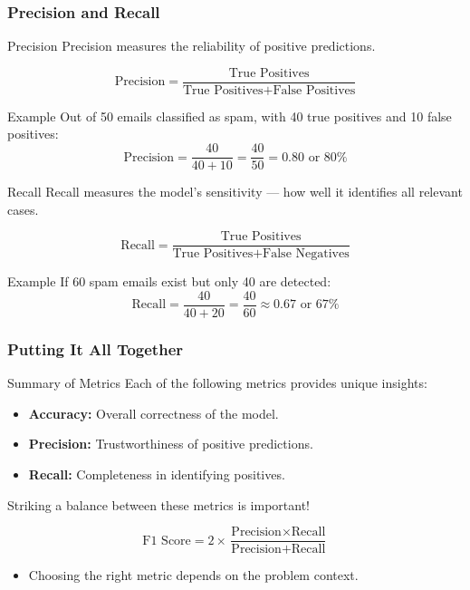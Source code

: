 \documentclass[aspectratio=169]{beamer}
\begin{document}
\begin{frame}[fragile]
    \frametitle{Precision and Recall}
    \begin{block}{Precision}
        Precision measures the reliability of positive predictions.
    \end{block}
    \begin{equation}
        \text{Precision} = \frac{\text{True Positives}}{\text{True Positives} + \text{False Positives}}
    \end{equation}
    
    \begin{exampleblock}{Example}
        Out of 50 emails classified as spam, with 40 true positives and 10 false positives:
        \[
        \text{Precision} = \frac{40}{40 + 10} = \frac{40}{50} = 0.80 \text{ or } 80\%
        \]
    \end{exampleblock}

    \begin{block}{Recall}
        Recall measures the model's sensitivity — how well it identifies all relevant cases.
    \end{block}
    \begin{equation}
        \text{Recall} = \frac{\text{True Positives}}{\text{True Positives} + \text{False Negatives}}
    \end{equation}
    \begin{exampleblock}{Example}
        If 60 spam emails exist but only 40 are detected:
        \[
        \text{Recall} = \frac{40}{40 + 20} = \frac{40}{60} \approx 0.67 \text{ or } 67\%
        \]
    \end{exampleblock}
\end{frame}

\begin{frame}[fragile]
    \frametitle{Putting It All Together}
    \begin{block}{Summary of Metrics}
        Each of the following metrics provides unique insights:
        \begin{itemize}
            \item \textbf{Accuracy:} Overall correctness of the model.
            \item \textbf{Precision:} Trustworthiness of positive predictions.
            \item \textbf{Recall:} Completeness in identifying positives.
        \end{itemize}
        Striking a balance between these metrics is important!
    \end{block}
    \begin{equation}
        \text{F1 Score} = 2 \times \frac{\text{Precision} \times \text{Recall}}{\text{Precision} + \text{Recall}}
    \end{equation}
    \begin{itemize}
        \item Choosing the right metric depends on the problem context.
    \end{itemize}
\end{frame}
\end{document}
